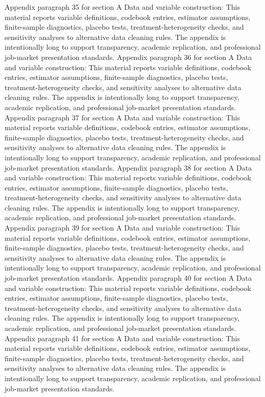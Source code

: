 \documentclass[preprint,12pt]{elsarticle}
\begin{document}
Appendix paragraph 35 for section A Data and variable construction: This material reports variable definitions, codebook entries, estimator assumptions, finite-sample diagnostics, placebo tests, treatment-heterogeneity checks, and sensitivity analyses to alternative data cleaning rules. The appendix is intentionally long to support transparency, academic replication, and professional job-market presentation standards.
Appendix paragraph 36 for section A Data and variable construction: This material reports variable definitions, codebook entries, estimator assumptions, finite-sample diagnostics, placebo tests, treatment-heterogeneity checks, and sensitivity analyses to alternative data cleaning rules. The appendix is intentionally long to support transparency, academic replication, and professional job-market presentation standards.
Appendix paragraph 37 for section A Data and variable construction: This material reports variable definitions, codebook entries, estimator assumptions, finite-sample diagnostics, placebo tests, treatment-heterogeneity checks, and sensitivity analyses to alternative data cleaning rules. The appendix is intentionally long to support transparency, academic replication, and professional job-market presentation standards.
Appendix paragraph 38 for section A Data and variable construction: This material reports variable definitions, codebook entries, estimator assumptions, finite-sample diagnostics, placebo tests, treatment-heterogeneity checks, and sensitivity analyses to alternative data cleaning rules. The appendix is intentionally long to support transparency, academic replication, and professional job-market presentation standards.
Appendix paragraph 39 for section A Data and variable construction: This material reports variable definitions, codebook entries, estimator assumptions, finite-sample diagnostics, placebo tests, treatment-heterogeneity checks, and sensitivity analyses to alternative data cleaning rules. The appendix is intentionally long to support transparency, academic replication, and professional job-market presentation standards.
Appendix paragraph 40 for section A Data and variable construction: This material reports variable definitions, codebook entries, estimator assumptions, finite-sample diagnostics, placebo tests, treatment-heterogeneity checks, and sensitivity analyses to alternative data cleaning rules. The appendix is intentionally long to support transparency, academic replication, and professional job-market presentation standards.
Appendix paragraph 41 for section A Data and variable construction: This material reports variable definitions, codebook entries, estimator assumptions, finite-sample diagnostics, placebo tests, treatment-heterogeneity checks, and sensitivity analyses to alternative data cleaning rules. The appendix is intentionally long to support transparency, academic replication, and professional job-market presentation standards.
\end{document}
